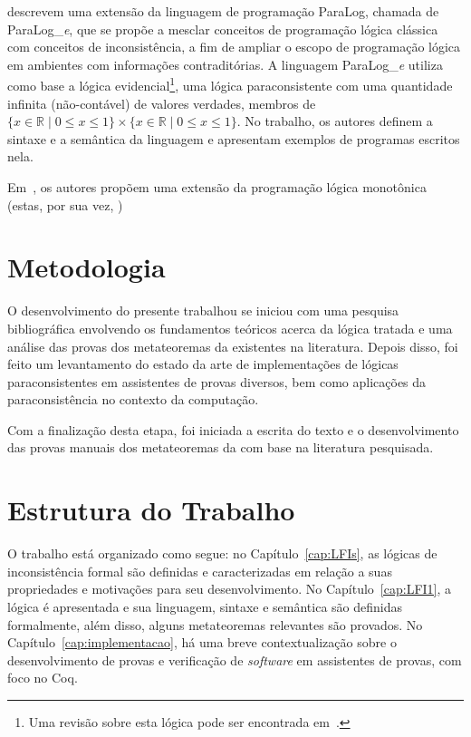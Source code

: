          descrevem uma extensão da linguagem de programação ParaLog, chamada de ParaLog\_\textit{e}, que se propõe a mesclar conceitos de programação lógica clássica com conceitos de inconsistência, a fim de ampliar o escopo de programação lógica em ambientes com informações contraditórias. A linguagem ParaLog\_\textit{e} utiliza como base a lógica evidencial\footnote{Uma revisão sobre esta lógica pode ser encontrada em~\cite{DECARVALHOJUNIOR2024107342}.}, uma lógica paraconsistente com uma quantidade infinita (não-contável) de valores verdades, membros de $\{x \in \mathbb{R} \; | \; 0 \leq x \leq 1\} \times \{x \in \mathbb{R} \; | \; 0 \leq x \leq 1\}$. No trabalho, os autores definem a sintaxe e a semântica da linguagem e apresentam exemplos de programas escritos nela.

        Em~\cite{antitonic}, os autores propõem uma extensão da programação lógica monotônica (estas, por sua vez, )


    \section{Metodologia}\label{sec:metodologia}
      O desenvolvimento do presente trabalhou se iniciou com uma pesquisa bibliográfica envolvendo os fundamentos teóricos acerca da lógica tratada e uma análise das provas dos metateoremas da \lfium{} existentes na literatura. Depois disso, foi feito um levantamento do estado da arte de implementações de lógicas paraconsistentes em assistentes de provas diversos, bem como aplicações da paraconsistência no contexto da computação.

     Com a finalização desta etapa, foi iniciada a escrita do texto e o desenvolvimento das provas manuais dos metateoremas da \lfium{} com base na literatura pesquisada.
        

    \section{Estrutura do Trabalho}\label{sec:estrutura}
        O trabalho está organizado como segue: no Capítulo~\ref{cap:LFIs}, as lógicas de inconsistência formal são definidas e caracterizadas em relação a suas propriedades e motivações para seu desenvolvimento. No Capítulo~\ref{cap:LFI1}, a lógica \lfium{} é apresentada e sua linguagem, sintaxe e semântica são definidas formalmente, além disso, alguns metateoremas relevantes são provados. No Capítulo~\ref{cap:implementacao}, há uma breve contextualização sobre o desenvolvimento de provas e verificação de \textit{software} em assistentes de provas, com foco no Coq. 
        
    


       